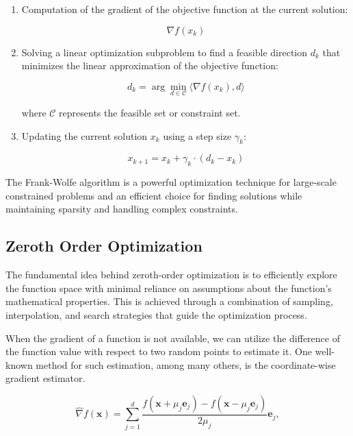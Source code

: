 \begin{multicols}{2}
\begin{enumerate}
    \item Computation of the gradient of the objective function at the current solution:
       
       \[ \nabla f(x_k) \]
    
    \item Solving a linear optimization subproblem to find a feasible direction \(d_k\) 
          that minimizes the linear approximation of the objective function:
    
       \[ d_k = \arg\min_{d \in \mathcal{C}} \langle \nabla f(x_k), d \rangle \]
    
       where \(\mathcal{C}\) represents the feasible set or constraint set.
    
    \item Updating the current solution \(x_k\) using a step size \(\gamma_k\):
    
       \[ x_{k+1} = x_k + \gamma_k \cdot (d_k - x_k) \]
    \end{enumerate}

    The Frank-Wolfe algorithm is a powerful optimization technique for large-scale 
    constrained problems and an efficient choice for finding solutions 
    while maintaining sparsity and handling complex constraints.

\subsection{Zeroth Order Optimization}

The fundamental idea behind zeroth-order optimization is to efficiently 
explore the function space with minimal reliance on assumptions about 
the function's mathematical properties.
This is achieved through a combination of sampling, interpolation,
and search strategies that guide the optimization process.

When the gradient of a function is not available, we can utilize the difference 
of the function value with respect to two random points to estimate it. 
One well-known method for such estimation, among many others, is the 
coordinate-wise gradient estimator.

\begin{equation}
\hat{\nabla} f(\mathbf{x})=\sum_{j=1}^d \frac{f\left(\mathbf{x}+\mu_j \mathbf{e}_j\right)-f\left(\mathbf{x}-\mu_j \mathbf{e}_j\right)}{2 \mu_j} \mathbf{e}_j,
\label{eq:coorwise-estim}
\end{equation}


\end{multicols}
